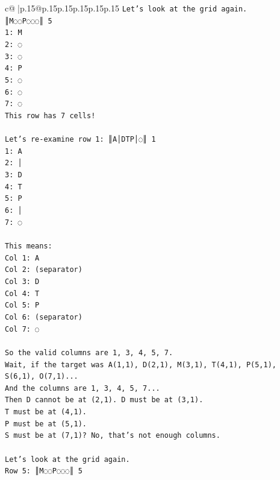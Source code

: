 \documentclass{article}
\begin{document}
{\begin{supertabular}{c@{$\;$}|p{.15\linewidth}@{}p{.15\linewidth}p{.15\linewidth}p{.15\linewidth}p{.15\linewidth}p{.15\linewidth}}
{{{\texttt{Let's look at the grid again.} \\
\texttt{║M◌◌P◌◌◌║ 5} \\
\texttt{1: M} \\
\texttt{2: ◌} \\
\texttt{3: ◌} \\
\texttt{4: P} \\
\texttt{5: ◌} \\
\texttt{6: ◌} \\
\texttt{7: ◌} \\
\texttt{This row has 7 cells!} \\
\\ 
\texttt{Let's re{-}examine row 1: ║A│DTP│◌║ 1} \\
\texttt{1: A} \\
\texttt{2: │} \\
\texttt{3: D} \\
\texttt{4: T} \\
\texttt{5: P} \\
\texttt{6: │} \\
\texttt{7: ◌} \\
\\ 
\texttt{This means:} \\
\texttt{Col 1: A} \\
\texttt{Col 2: (separator)} \\
\texttt{Col 3: D} \\
\texttt{Col 4: T} \\
\texttt{Col 5: P} \\
\texttt{Col 6: (separator)} \\
\texttt{Col 7: ◌} \\
\\ 
\texttt{So the valid columns are 1, 3, 4, 5, 7.} \\
\texttt{Wait, if the target was A(1,1), D(2,1), M(3,1), T(4,1), P(5,1), S(6,1), O(7,1)...} \\
\texttt{And the columns are 1, 3, 4, 5, 7...} \\
\texttt{Then D cannot be at (2,1). D must be at (3,1).} \\
\texttt{T must be at (4,1).} \\
\texttt{P must be at (5,1).} \\
\texttt{S must be at (7,1)? No, that's not enough columns.} \\
\\ 
\texttt{Let's look at the grid again.} \\
\texttt{Row 5: ║M◌◌P◌◌◌║ 5} \\
}}}
\end{supertabular}}
\end{document}
